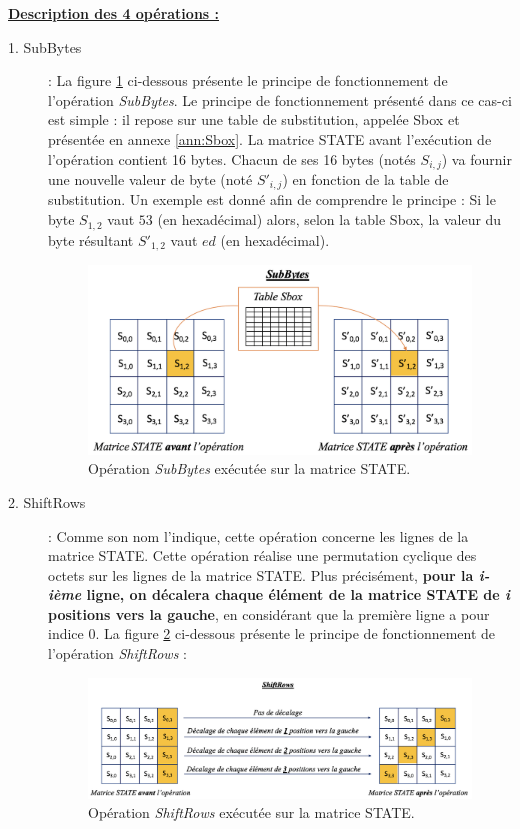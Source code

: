 \documentclass[oneside]{book}
\begin{document}
\newpage
\underline{\textbf{Description des 4 opérations :}} \\
\begin{description}
\item[1. SubBytes]: La figure \ref{fig:SubBytes} ci-dessous présente le principe de fonctionnement de l'opération \textit{SubBytes}. Le principe de fonctionnement présenté dans ce cas-ci est simple : il repose sur une table de substitution, appelée Sbox et présentée en annexe \ref{ann:Sbox}. La matrice STATE avant l'exécution de l'opération contient 16 bytes. Chacun de ses 16 bytes (notés $S_{i,j}$) va fournir une nouvelle valeur de byte (noté $S'_{i,j}$) en fonction de la table de substitution. Un exemple est donné afin de comprendre le principe : Si le byte $S_{1,2}$ vaut $53$ (en hexadécimal) alors, selon la table Sbox, la valeur du byte résultant $S'_{1,2}$ vaut $ed$ (en hexadécimal).

\begin{figure}[htbp]
    \centering
    \includegraphics[scale=0.58]{image/SubBytes}
    \caption{Opération \textit{SubBytes} exécutée sur la matrice STATE.}
    \label{fig:SubBytes}
\end{figure}
\vspace{1cm}

\item[2. ShiftRows]: Comme son nom l'indique, cette opération concerne les lignes de la matrice STATE. Cette opération réalise une permutation cyclique des octets sur les lignes de la matrice STATE. Plus précisément, \textbf{pour la \textit{i-ième} ligne, on décalera chaque élément de la matrice STATE de \textit{i} positions vers la gauche}, en considérant que la première ligne a pour indice 0.
La figure \ref{fig:ligne} ci-dessous présente le principe de fonctionnement de l'opération \textit{ShiftRows} :
\begin{figure}[htbp]
    \centering
    \includegraphics[scale=0.8]{image/ligne}
    \caption{Opération \textit{ShiftRows} exécutée sur la matrice STATE.}
    \label{fig:ligne}
\end{figure}


\end{description}
\end{document}
